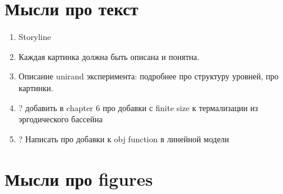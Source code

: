 

\section*{Мысли про текст}

\begin{enumerate}
	\item Storyline
	\item Каждая картинка должна быть описана и понятна. 
	\item Описание unirand эксперимента: подробнее про структуру уровней, про картинки.
	\item ? добавить в chapter 6 про добавки с finite size к термализации из эргодического бассейна
	\item ? Написать про добавки к obj function в линейной модели
	
	



\end{enumerate}



\section*{Мысли про figures}


